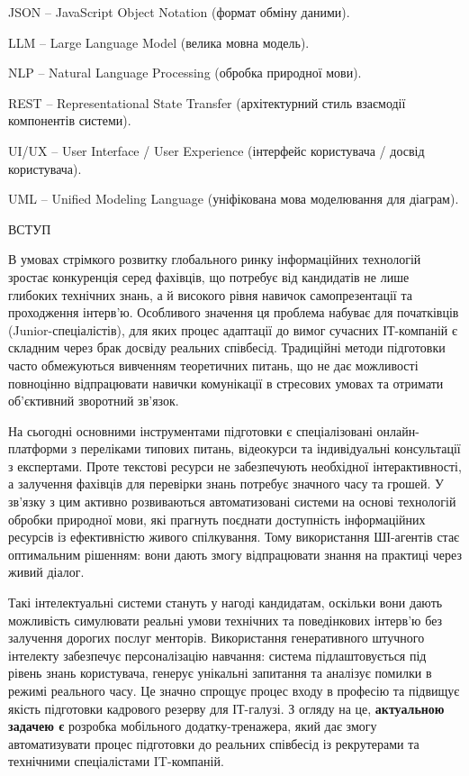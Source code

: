 JSON -- JavaScript Object Notation (формат обміну даними).

LLM -- Large Language Model (велика мовна модель).

NLP -- Natural Language Processing (обробка природної мови).

REST -- Representational State Transfer (архітектурний стиль взаємодії
компонентів системи).

UI/UX -- User Interface / User Experience (інтерфейс користувача /
досвід користувача).

UML -- Unified Modeling Language (уніфікована мова моделювання для
діаграм).

\protect{}\label{_Toc228981050}{}ВСТУП

В умовах стрімкого розвитку глобального ринку інформаційних технологій
зростає конкуренція серед фахівців, що потребує від кандидатів не лише
глибоких технічних знань, а й високого рівня навичок самопрезентації та
проходження інтерв'ю. Особливого значення ця проблема набуває для
початківців (Junior-спеціалістів), для яких процес адаптації до вимог
сучасних ІТ-компаній є складним через брак досвіду реальних співбесід.
Традиційні методи підготовки часто обмежуються вивченням теоретичних
питань, що не дає можливості повноцінно відпрацювати навички комунікації
в стресових умовах та отримати об'єктивний зворотний зв'язок.

На сьогодні основними інструментами підготовки є спеціалізовані
онлайн-платформи з переліками типових питань, відеокурси та
індивідуальні консультації з експертами. Проте текстові ресурси не
забезпечують необхідної інтерактивності, а залучення фахівців для
перевірки знань потребує значного часу та грошей. У зв'язку з цим
активно розвиваються автоматизовані системи на основі технологій обробки
природної мови, які прагнуть поєднати доступність інформаційних ресурсів
із ефективністю живого спілкування. Тому використання ШІ-агентів стає
оптимальним рішенням: вони дають змогу відпрацювати знання на практиці
через живий діалог.

Такі інтелектуальні системи стануть у нагоді кандидатам, оскільки вони
дають можливість симулювати реальні умови технічних та поведінкових
інтерв'ю без залучення дорогих послуг менторів. Використання
генеративного штучного інтелекту забезпечує персоналізацію навчання:
система підлаштовується під рівень знань користувача, генерує унікальні
запитання та аналізує помилки в режимі реального часу. Це значно спрощує
процес входу в професію та підвищує якість підготовки кадрового резерву
для ІТ-галузі. З огляду на це, \textbf{актуальною задачею є} розробка
мобільного додатку-тренажера, який дає змогу автоматизувати процес
підготовки до реальних співбесід із рекрутерами та технічними
спеціалістами IT-компаній.

